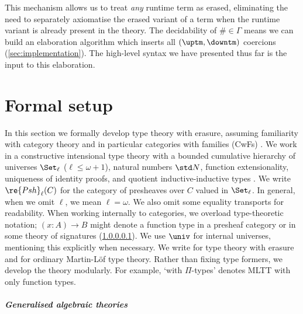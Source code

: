 This mechanism allows us to treat \emph{any} runtime term as erased, eliminating
the need to separately axiomatise the erased variant of a term when the runtime
variant is already present in the theory. The decidability of $\# \in \Gamma$
means we can build an elaboration algorithm which inserts all $(\uptm,\downtm)$
coercions (\cref{sec:implementation}). The high-level syntax we have presented
thus far is the input to this elaboration.

\section{Formal setup} \label{sec:formal}

In this section we formally develop type theory with erasure, assuming
familiarity with category theory and in particular categories with families
(CwFs) \cite{Castellan2019-sh}. We work in a constructive intensional type
theory with a bounded cumulative hierarchy of universes $\Set_\ell$ ($\ell \leq
\omega + 1$), natural numbers $\std N$, function extensionality, uniqueness of
identity proofs, and quotient inductive-inductive types
\cite{Altenkirch2018-nd}. We write $\re{Psh}_{\ell}(C)$ for the category of
presheaves over $C$ valued in $\Set_\ell$. In general, when we omit $\ell$, we
mean $\ell = \omega$. We also omit some equality transports for readability.
When working internally to categories, we overload type-theoretic notation; $(x
: A) \to B$ might denote a function type in a presheaf category
\cite{Hofmann1997-on} or in some theory of signatures (\cref{par:gat}). We use
$\univ$ for internal universes, mentioning this explicitly when necessary. We
write \ZTT for type theory with erasure and \TT for ordinary Martin-L\"of type
theory. Rather than fixing type formers, we develop the theory modularly. For
example, `\TT with $\Pi$-types' denotes MLTT with only function types.

\subparagraph{Generalised algebraic theories}\label{par:gat}

